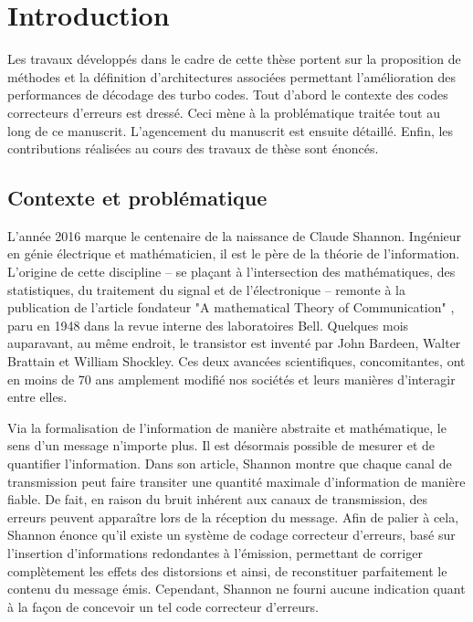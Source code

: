 \chapter*{Introduction}

Les travaux développés dans le cadre de cette thèse portent sur la proposition de méthodes et la définition 
d'architectures associées permettant 
l'amélioration des performances de décodage des turbo codes. Tout d'abord le contexte des codes correcteurs d'erreurs 
est dressé. Ceci mène à la problématique traitée tout au long de ce manuscrit. L'agencement du manuscrit est 
ensuite détaillé. Enfin, les contributions réalisées au cours des travaux de thèse sont énoncés.

\section*{Contexte et problématique}
L'année 2016 marque le centenaire de la naissance de Claude Shannon. Ingénieur en génie électrique et mathématicien, il 
est le père de la théorie de l'information. L'origine de cette discipline -- se plaçant à l'intersection des mathématiques, 
des statistiques, du traitement du signal et de l'électronique -- remonte à la publication de l'article fondateur 
"A mathematical Theory of Communication" \cite{shannon_mathematical_2001}, paru en 1948 dans la revue interne des laboratoires Bell. Quelques mois 
auparavant, au même endroit, le transistor est inventé par John Bardeen, Walter Brattain et William Shockley. Ces deux 
avancées scientifiques, concomitantes, ont en moins de 70 ans amplement modifié nos sociétés et leurs manières d’interagir entre elles. 

Via la formalisation de l'information de manière abstraite et mathématique, le sens d'un message n'importe plus. Il est 
désormais possible de mesurer et de quantifier l'information. %
Dans son article, Shannon montre que chaque canal de transmission peut faire transiter une quantité maximale 
d'information de manière fiable. De fait, en raison du bruit inhérent aux canaux de transmission, des erreurs peuvent apparaître
lors de la réception du message. Afin de palier à cela, Shannon énonce qu'il existe un système de codage correcteur d'erreurs, 
basé sur l'insertion d'informations redondantes à l’émission, permettant de corriger complètement les effets des distorsions et ainsi, de reconstituer parfaitement
le contenu du message émis. Cependant, Shannon ne fourni aucune indication quant à la façon de concevoir un tel code
correcteur d'erreurs.

